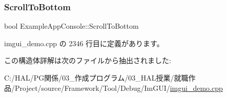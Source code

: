 \subsubsection{\texorpdfstring{Scroll\+To\+Bottom}{ScrollToBottom}}
{\footnotesize\ttfamily bool Example\+App\+Console\+::\+Scroll\+To\+Bottom}



 imgui\+\_\+demo.\+cpp の 2346 行目に定義があります。



この構造体詳解は次のファイルから抽出されました\+:\begin{DoxyCompactItemize}
\item 
C\+:/\+H\+A\+L/\+P\+G関係/03\+\_\+作成プログラム/03\+\_\+\+H\+A\+L授業/就職作品/\+Project/source/\+Framework/\+Tool/\+Debug/\+Im\+G\+U\+I/\mbox{\hyperlink{imgui__demo_8cpp}{imgui\+\_\+demo.\+cpp}}\end{DoxyCompactItemize}
